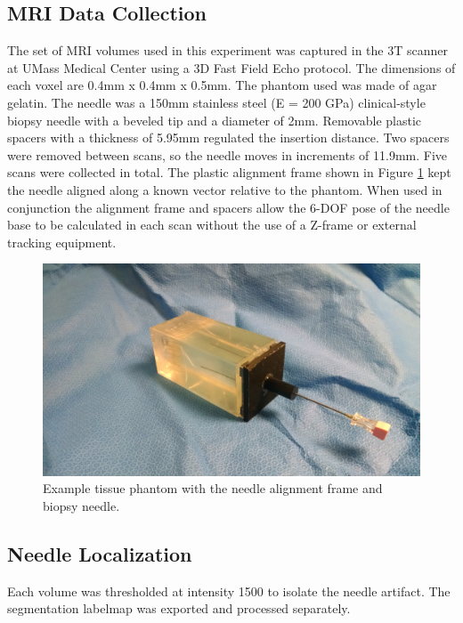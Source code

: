 \subsection{MRI Data Collection}
The set of MRI volumes used in this experiment was captured in the 3T scanner at UMass Medical Center using a 3D Fast Field Echo protocol. The dimensions of each voxel are 0.4mm x 0.4mm x 0.5mm. The phantom used was made of agar gelatin. The needle was a 150mm stainless steel (E = 200 GPa) clinical-style biopsy needle with a beveled tip and a diameter of 2mm. Removable plastic spacers with a thickness of 5.95mm regulated the insertion distance. Two spacers were removed between scans, so the needle moves in increments of 11.9mm. Five scans were collected in total. The plastic alignment frame shown in Figure \ref{fig:needle_guide} kept the needle aligned along a known vector relative to the phantom. When used in conjunction the alignment frame and spacers allow the 6-DOF pose of the needle base to be calculated in each scan without the use of a Z-frame or external tracking equipment.

\begin{figure}[h]
\includegraphics[width=1.0\textwidth]{Fig/chap5/phantom_with_needle_guide_small_2.jpg}
\caption{Example tissue phantom with the needle alignment frame and biopsy needle.}
\label{fig:needle_guide}
\end{figure}

\subsection{Needle Localization}

Each volume was thresholded at intensity 1500 to isolate the needle artifact. The segmentation labelmap was exported and processed separately.

